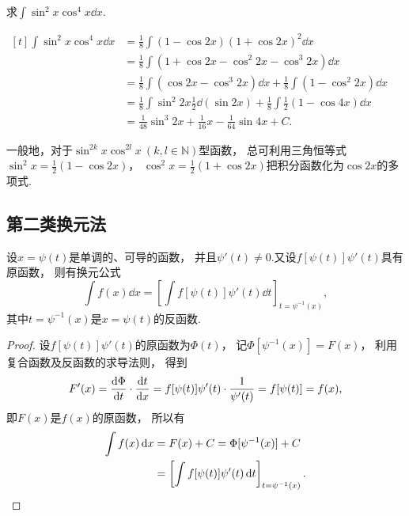 \begin{example}
求\(\int \sin^2 x \cos^4 x \dd{x}\).
\begin{solution}
\(\begin{aligned}[t]
	\int \sin^2 x \cos^4 x \dd{x}
	&= \frac{1}{8} \int (1 - \cos 2x) (1 + \cos 2x)^2 \dd{x} \\
	&= \frac{1}{8} \int (1 + \cos 2x - \cos^2 2x - \cos^3 2x) \dd{x} \\
	&= \frac{1}{8} \int (\cos 2x - \cos^3 2x) \dd{x}
		+ \frac{1}{8} \int (1 - \cos^2 2x) \dd{x} \\
	&= \frac{1}{8} \int \sin^2 2x \frac{1}{2} \dd(\sin 2x)
		+ \frac{1}{8} \int \frac{1}{2} (1 - \cos 4x) \dd{x} \\
	&= \frac{1}{48} \sin^3 2x + \frac{1}{16} x - \frac{1}{64} \sin 4x + C.
\end{aligned}\)
\end{solution}
\end{example}

一般地，对于\(\sin^{2k} x \cos^{2l} x\ (k,l\in\mathbb{N})\)型函数，
总可利用三角恒等式\(\sin^2 x = \frac{1}{2} (1 - \cos 2x)\)，
\(\cos^2 x = \frac{1}{2} (1 + \cos 2x)\)把积分函数化为\(\cos 2x\)的多项式.

\subsection{第二类换元法}

\begin{theorem}
设\(x = \psi(t)\)是单调的、可导的函数，
并且\(\psi'(t) \neq 0\).又设\(f[\psi(t)] \psi'(t)\)具有原函数，
则有换元公式\[
	\int f(x) \dd{x} = \left[ \int f[\psi(t)] \psi'(t) \dd{t} \right]_{t=\psi^{-1}(x)},
\]
其中\(t=\psi^{-1}(x)\)是\(x=\psi(t)\)的反函数.
\begin{proof}
设\(f[\psi(t)] \psi'(t)\)的原函数为\(\Phi(t)\)，
记\(\Phi[\psi^{-1}(x)] = F(x)\)，
利用复合函数及反函数的求导法则，
得到\[
	F'(x) = \dv{\Phi}{t} \cdot \dv{t}{x}
	= f[\psi(t)] \psi'(t) \cdot \frac{1}{\psi'(t)}
	= f[\psi(t)] = f(x),
\]
即\(F(x)\)是\(f(x)\)的原函数，
所以有\begin{align*}
	\int f(x) \dd{x} &= F(x) + C
	= \Phi[\psi^{-1}(x)] + C \\
	&= \left[ \int f[\psi(t)] \psi'(t) \dd{t} \right]_{t=\psi^{-1}(x)}.
	\qedhere
\end{align*}
\end{proof}
\end{theorem}

